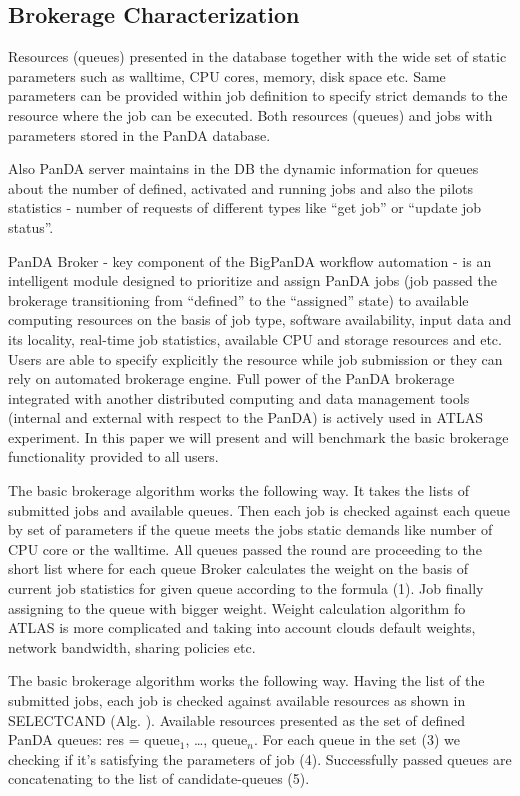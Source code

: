 \subsection{Brokerage Characterization}
\label{subsec:brokerage}

Resources (queues) presented in the database together with the wide set of
static parameters such as walltime, CPU cores, memory, disk space etc. Same
parameters can be provided within job definition to specify strict demands to
the resource where the job can be executed. Both resources (queues) and jobs
with parameters stored in the PanDA database.

Also PanDA server maintains in the DB the dynamic information for queues
about the number of defined, activated and running jobs and also the pilots
statistics - number of requests of different types like ``get job'' or
``update job status''.

PanDA Broker - key  component of the BigPanDA workflow automation - is an
intelligent module designed to prioritize and assign PanDA jobs (job passed
the brokerage transitioning from ``defined'' to the ``assigned'' state) to
available computing resources on the basis of job type, software
availability, input data and its locality, real-time job statistics,
available CPU and storage resources and etc. Users are able to specify
explicitly the resource while job submission or they can rely on automated
brokerage engine. Full power of the PanDA brokerage integrated with another
distributed computing and data management tools (internal and external with
respect to the PanDA) is actively used in ATLAS experiment. In this paper we
will present and will benchmark the basic brokerage functionality provided to
all users.

The basic brokerage algorithm works the following way. It takes the lists of
submitted jobs and available queues. Then each job is checked against each
queue by set of parameters if the queue meets the jobs static demands like
number of CPU core or the walltime. All queues passed the round are
proceeding to the short list where for each queue Broker calculates the
weight on the basis of current job statistics for given queue according to
the formula (1). Job finally assigning to the queue with bigger weight.
Weight calculation algorithm fo ATLAS is more complicated and taking into
account clouds default weights, network bandwidth, sharing policies etc.

The basic brokerage algorithm works the following way. Having the list of the
submitted jobs, each job is checked against available resources as shown in
SELECT{\textunderscore}CAND (Alg. ). Available resources presented as the set
of defined PanDA queues: res = queue$_1$, \ldots, queue$_n$. For each queue
in the set (3) we checking if it's satisfying the parameters of job (4).
Successfully passed queues are concatenating to the list of candidate-queues
(5).

